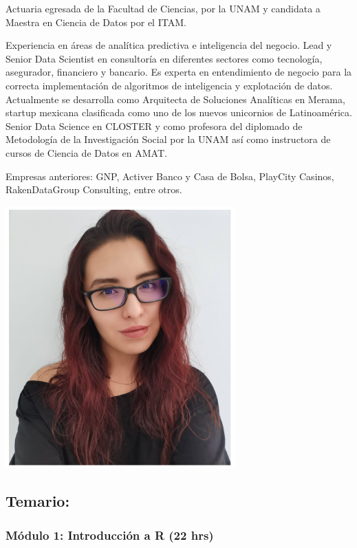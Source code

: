 \documentclass[
]{book}
\begin{document}
Actuaria egresada de la Facultad de Ciencias, por la UNAM y candidata a Maestra en
Ciencia de Datos por el ITAM.

Experiencia en áreas de analítica predictiva e inteligencia del negocio. Lead y Senior
Data Scientist en consultoría en diferentes sectores como tecnología, asegurador,
financiero y bancario. Es experta en entendimiento de negocio para la correcta
implementación de algoritmos de inteligencia y explotación de datos.
Actualmente se desarrolla como Arquitecta de Soluciones Analíticas en Merama,
startup mexicana clasificada como uno de los nuevos unicornios de Latinoamérica.
Senior Data Science en CLOSTER y como profesora del diplomado de Metodología
de la Investigación Social por la UNAM así como instructora de cursos de Ciencia de
Datos en AMAT.

Empresas anteriores: GNP, Activer Banco y Casa de Bolsa, PlayCity Casinos,
RakenDataGroup Consulting, entre otros.

\begin{center}\includegraphics[width=250pt]{img/00-presentacion/lizzy} \end{center}

\hypertarget{temario}{%
\subsection*{Temario:}\label{temario}}

\hypertarget{muxf3dulo-1-introducciuxf3n-a-r-22-hrs}{%
\subsubsection*{Módulo 1: Introducción a R (22 hrs)}\label{muxf3dulo-1-introducciuxf3n-a-r-22-hrs}}
\end{document}
